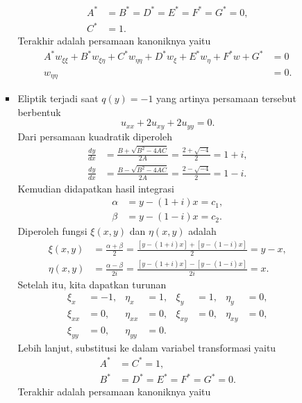 \documentclass[a4paper]{article}
\theoremstyle{definition}
\begin{document}
\begin{enumerate}
\begin{enumerate}
\begin{itemize}
\begin{align*}
        A^* &= B^* = D^* = E^* = F^* = G^* = 0, \\
        C^* &= 1.
      \end{align*}
      Terakhir adalah persamaan kanoniknya yaitu
      \begin{align*}
        A^* w_{\xi\xi} + B^* w_{\xi\eta} + C^* w_{\eta\eta} + D^* w_{\xi} + E^* w_{\eta} + F^* w + G^* &= 0 \\
        w_{\eta\eta} &= 0.
      \end{align*}
      \item Eliptik terjadi saat $q(y) = -1$ yang artinya persamaan tersebut berbentuk
      \[
      u_{xx} + 2u_{xy} + 2u_{yy} = 0.
      \]
      Dari persamaan kuadratik diperoleh
      \begin{align*}
        \frac{dy}{dx} &= \frac{B + \sqrt{B^2 - 4AC}}{2A} = \frac{2 + \sqrt{-4}}{2} = 1 + i, \\
        \frac{dy}{dx} &= \frac{B - \sqrt{B^2 - 4AC}}{2A} = \frac{2 - \sqrt{-4}}{2} = 1 - i.
      \end{align*}
      Kemudian didapatkan hasil integrasi
      \begin{align*}
        \alpha &= y - (1+i)x = c_1, \\
        \beta &= y - (1-i)x = c_2.
      \end{align*}
      Diperoleh fungsi $\xi(x,y)$ dan $\eta(x,y)$ adalah
      \begin{align*}
        \xi(x,y) &= \frac{\alpha+\beta}{2} = \frac{[y-(1+i)x] +[y-(1-i)x]}{2} = y-x, \\
        \eta(x,y) &= \frac{\alpha-\beta}{2i} = \frac{[y-(1+i)x] -[y-(1-i)x]}{2i} = x.
      \end{align*}
      Setelah itu, kita dapatkan turunan
      \begin{align*}
        \xi_x &= -1, & \eta_x &= 1, &
        \xi_y &= 1, & \eta_y &= 0, \\
        \xi_{xx} &= 0, & \eta_{xx} &= 0, &
        \xi_{xy} &= 0, & \eta_{xy} &= 0, \\
        \xi_{yy} &= 0, & \eta_{yy} &= 0.
      \end{align*}
      Lebih lanjut, substitusi ke dalam variabel transformasi yaitu
      \begin{align*}
        A^* &= C^* = 1, \\
        B^* &= D^* = E^* = F^* = G^* = 0.
      \end{align*}
      Terakhir adalah persamaan kanoniknya yaitu
      \begin{align*}

\end{align*}
\end{itemize}
\end{enumerate}
\end{enumerate}
\end{document}
